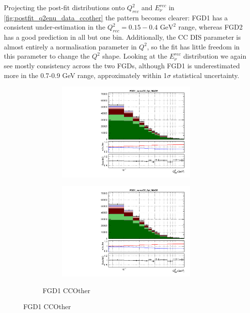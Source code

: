 Projecting the post-fit distributions onto $Q^2_{rec}$ and $E_\nu^{rec}$ in \autoref{fig:postfit_q2enu_data_ccother} the pattern becomes clearer: FGD1 has a consistent under-estimation in the $Q^2_{rec}=0.15-0.4\text{ GeV}^2$ range, whereas FGD2 has a good prediction in all but one bin. Additionally, the CC DIS parameter is almost entirely a normalisation parameter in $Q^2$, so the fit has little freedom in this parameter to change the $Q^2$ shape. Looking at the $E_\nu^{rec}$ distribution we again see mostly consistency across the two FGDs, although FGD1 is underestimated more in the 0.7-0.9 GeV range, approximately within 1$\sigma$ statistical uncertainty.
\begin{figure}[h]
	\begin{subfigure}[t]{\textwidth}
	\begin{subfigure}[t]{0.49\textwidth}
		\includegraphics[width=\textwidth, trim={0mm 0mm 0mm 6mm}, clip,page=97]{figures/mach3/data/postfit/2017b_NewData_NewDet_UpdXsecStep_2Xsec_4Det_5Flux_0_PostFit_5_4_rootstack}
	\end{subfigure}
	\begin{subfigure}[t]{0.49\textwidth}
		\includegraphics[width=\textwidth, trim={0mm 0mm 0mm 6mm}, clip,page=98]{figures/mach3/data/postfit/2017b_NewData_NewDet_UpdXsecStep_2Xsec_4Det_5Flux_0_PostFit_5_4_rootstack}
	\end{subfigure}
\caption{FGD1 CCOther}
\end{subfigure}


\end{figure}
